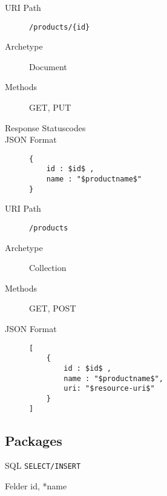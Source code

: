 \documentclass[10pt,a4paper]{scrartcl}
\begin{document}
\begin{mdframed}[style=def]
\begin{description}
	\item[URI Path] \texttt{/products/\{id\}}
	\item[Archetype] Document
	\item[Methods] GET, PUT
	\item[Response Statuscodes] \hfill
	\item[JSON Format] \hfill
\begin{lstlisting}
{
	id : $id$ ,
	name : "$productname$"
}
\end{lstlisting}
\end{description}
\end{mdframed}

\begin{mdframed}[style=def]
\begin{description}
	\item[URI Path] \texttt{/products}
	\item[Archetype] Collection
	\item[Methods] GET, POST
	\item[JSON Format] \hfill
\begin{lstlisting}
[
	{
		id : $id$ ,
		name : "$productname$",
		uri: "$resource-uri$"
	}
]
\end{lstlisting}
\end{description}
\end{mdframed}


\pagebreak
\subsection{Packages}

\begin{description*}
    \item[SQL] \texttt{SELECT/INSERT}
    \item[Felder] id, *name
\end{description*}
\end{document}
